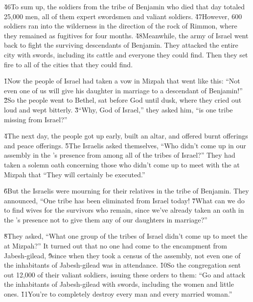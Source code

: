 \v{46}To sum up, the soldiers from the tribe of Benjamin who died that day totaled 25,000 men, all of them expert swordsmen and valiant soldiers. \v{47}However, 600 soldiers ran into the wilderness in the direction of the rock of Rimmon, where they remained as fugitives for four months. \v{48}Meanwhile, the army of Israel went back to fight the surviving descendants of Benjamin. They attacked the entire city with swords, including its cattle and everyone they could find. Then they set fire to all of the cities that they could find.

\v{1}Now the people of Israel had taken a vow in Mizpah that went like this: ``Not even one of us will give his daughter in marriage to a descendant of Benjamin!'' \v{2}So the people went to Bethel, sat before God until dusk, where they cried out loud and wept bitterly. \v{3}``Why,  God of Israel,'' they asked him, ``is one tribe missing from Israel?''

\v{4}The next day, the people got up early, built an altar, and offered burnt offerings and peace offerings. \v{5}The Israelis asked themselves, ``Who didn't come up in our assembly in the 's presence from among all of the tribes of Israel?'' They had taken a solemn oath concerning those who didn't come up to meet with the  at Mizpah that ``They will certainly be executed.''

\v{6}But the Israelis were mourning for their relatives in the tribe of Benjamin. They announced, ``One tribe has been eliminated from Israel today! \v{7}What can we do to find wives for the survivors who remain, since we've already taken an oath in the 's presence not to give them any of our daughters in marriage?''

\v{8}They asked, ``What one group of the tribes of Israel didn't come up to meet the  at Mizpah?'' It turned out that no one had come to the encampment from Jabesh-gilead, \v{9}since when they took a census of the assembly, not even one of the inhabitants of Jabesh-gilead was in attendance. \v{10}So the congregation sent out 12,000 of their valiant soldiers, issuing these orders to them: ``Go and attack the inhabitants of Jabesh-gilead with swords, including the women and little ones. \v{11}You're to completely destroy every man and every married woman.''


